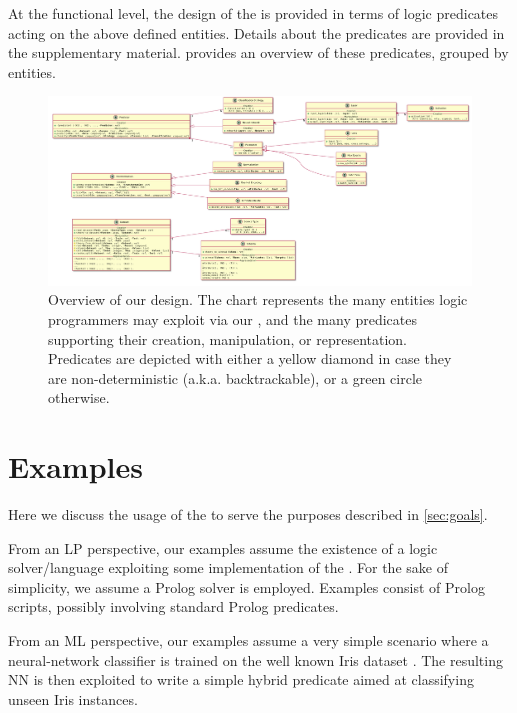 \documentclass{article}
\begin{document}
At the functional level, the design of the \mllib{} is provided in terms of logic predicates acting on the above defined entities.
%
Details about the predicates are provided in the supplementary material.
%
 provides an overview of these predicates, grouped by entities.

\begin{figure}
    \centering
    \includegraphics[width=\linewidth]{figures/entities.pdf}
    \caption{Overview of our \mllib{} design. The chart represents the many entities logic programmers may exploit via our \mllib{}, and the many predicates supporting their creation, manipulation, or representation. Predicates are depicted with either a yellow diamond in case they are non-deterministic (a.k.a. backtrackable), or a green circle otherwise.}
    \label{fig:design-overview}
\end{figure}

\section{\mllib{} Examples}
\label{sec:examples}

Here we discuss the usage of the \mllib{} to serve the purposes described in \cref{sec:goals}.

From an LP perspective, our examples assume the existence of a logic solver/language exploiting some implementation of the \mllib{}.
%
For the sake of simplicity, we assume a Prolog solver is employed.
%
Examples consist of Prolog scripts, possibly involving standard Prolog predicates.

From an ML perspective, our examples assume a very simple scenario where a neural-network classifier is trained on the well known Iris dataset \cite{iris-dataset}.
%
The resulting NN is then exploited to write a simple hybrid predicate aimed at classifying unseen Iris instances.
\end{document}
